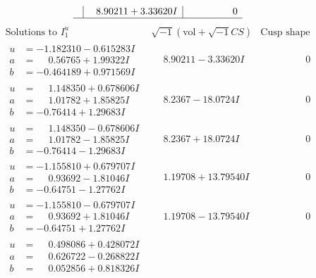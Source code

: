 \documentclass[1p]{elsarticle_modified}
\theoremstyle{definition}
\newcommand{\I}{\sqrt{-1}}
\begin{document}
$$\begin{array}{c|c|c}
 & \phantom{-}8.90211 + 3.33620 I & \phantom{-0.000000 } 0\\
 \hline 
 \end{array}$$\newpage$$\begin{array}{c|c|c}  
\text{Solutions to }I^u_{1}& \I (\text{vol} + \sqrt{-1}CS) & \text{Cusp shape}\\
 \hline 
\begin{aligned}
u &= -1.182310 - 0.615283 I \\
a &= \phantom{-}0.56765 + 1.99322 I \\
b &= -0.464189 + 0.971569 I\end{aligned}
 & \phantom{-}8.90211 - 3.33620 I & \phantom{-0.000000 } 0 \\ \hline\begin{aligned}
u &= \phantom{-}1.148350 + 0.678606 I \\
a &= \phantom{-}1.01782 + 1.85825 I \\
b &= -0.76414 + 1.29683 I\end{aligned}
 & \phantom{-}8.2367 - 18.0724 I & \phantom{-0.000000 } 0 \\ \hline\begin{aligned}
u &= \phantom{-}1.148350 - 0.678606 I \\
a &= \phantom{-}1.01782 - 1.85825 I \\
b &= -0.76414 - 1.29683 I\end{aligned}
 & \phantom{-}8.2367 + 18.0724 I & \phantom{-0.000000 } 0 \\ \hline\begin{aligned}
u &= -1.155810 + 0.679707 I \\
a &= \phantom{-}0.93692 - 1.81046 I \\
b &= -0.64751 - 1.27762 I\end{aligned}
 & \phantom{-}1.19708 + 13.79540 I & \phantom{-0.000000 } 0 \\ \hline\begin{aligned}
u &= -1.155810 - 0.679707 I \\
a &= \phantom{-}0.93692 + 1.81046 I \\
b &= -0.64751 + 1.27762 I\end{aligned}
 & \phantom{-}1.19708 - 13.79540 I & \phantom{-0.000000 } 0 \\ \hline\begin{aligned}
u &= \phantom{-}0.498086 + 0.428072 I \\
a &= \phantom{-}0.626722 - 0.268822 I \\
b &= \phantom{-}0.052856 + 0.818326 I\end{aligned}

\end{array}$$
\end{document}
